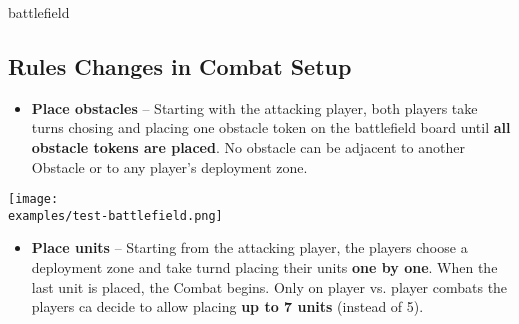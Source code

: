 \begin{expansion}{battlefield}
\begin{multicols*}{2}
  \subsection*{Rules Changes in Combat Setup}
  \begin{itemize}
  	\item \textbf{Place obstacles} – Starting with the attacking player, both players take turns chosing and placing one obstacle token on the battlefield board until \textbf{all obstacle tokens are placed}. No obstacle can be adjacent to another Obstacle or to any player's deployment zone.
  \end{itemize}
  	\texttt{[image: \\examples/test-battlefield.png]}
  \begin{itemize}
  	\item \textbf{Place units}  – Starting from the attacking player, the players choose a deployment zone and take turnd placing their units \textbf{one by one}. When the last unit is placed, the Combat begins. Only on player vs. player combats the players ca decide to allow placing \textbf{up to 7 units} (instead of 5).
  \end{itemize}
  \end{multicols*}
\end{expansion}

